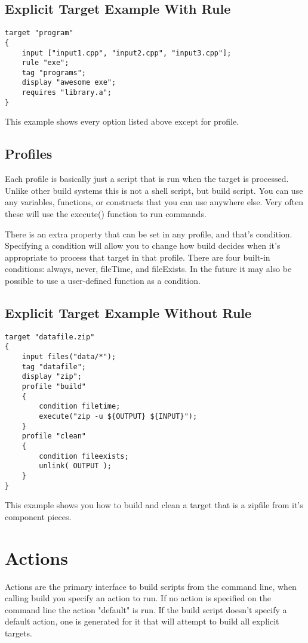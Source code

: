 \documentclass[letterpaper]{book}
\begin{document}
\subsection{Explicit Target Example With Rule}
\begin{lstlisting}
target "program"
{
    input ["input1.cpp", "input2.cpp", "input3.cpp"];
    rule "exe";
    tag "programs";
    display "awesome exe";
    requires "library.a";
}
\end{lstlisting}
This example shows every option listed above except for profile.

\subsection{Profiles}
Each profile is basically just a script that is run when the target is
processed.  Unlike other build systems this is not a shell script, but build
script.  You can use any variables, functions, or constructs that you can use
anywhere else.  Very often these will use the execute() function to run
commands.

There is an extra property that can be set in any profile, and that's condition.
Specifying a condition will allow you to change how build decides when it's
appropriate to process that target in that profile.  There are four built-in
conditions: always, never, fileTime, and fileExists.  In the future it may also
be possible to use a user-defined function as a condition.


\subsection{Explicit Target Example Without Rule}
\begin{lstlisting}
target "datafile.zip"
{
    input files("data/*");
    tag "datafile";
    display "zip";
    profile "build"
    {
        condition filetime;
        execute("zip -u ${OUTPUT} ${INPUT}");
    }
    profile "clean"
    {
        condition fileexists;
        unlink( OUTPUT );
    }
}
\end{lstlisting}

This example shows you how to build and clean a target that is a zipfile from
it's component pieces.

\section{Actions}
Actions are the primary interface to build scripts from the command line, when
calling build you specify an action to run.  If no action is specified on the
command line the action "default" is run.  If the build script doesn't specify
a default action, one is generated for it that will attempt to build all
explicit targets.
\end{document}
